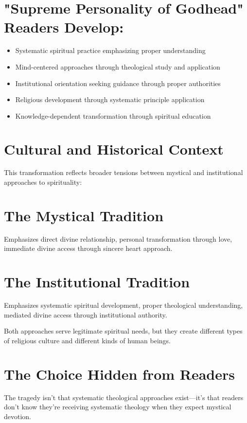 \documentclass[11pt,twoside]{book}
\begin{document}
\section*{"Supreme Personality of Godhead" Readers Develop:}
\label{sec:org614ab27}
\begin{itemize}
\item Systematic spiritual practice emphasizing proper understanding
\item Mind-centered approaches through theological study and application
\item Institutional orientation seeking guidance through proper authorities
\item Religious development through systematic principle application
\item Knowledge-dependent transformation through spiritual education
\end{itemize}
\section*{Cultural and Historical Context}
\label{sec:org702b9c1}

This transformation reflects broader tensions between mystical and institutional approaches to spirituality:
\section*{The Mystical Tradition}
\label{sec:orgc9bf535}
Emphasizes direct divine relationship, personal transformation through love, immediate divine access through sincere heart approach.
\section*{The Institutional Tradition}
\label{sec:org3746a32}
Emphasizes systematic spiritual development, proper theological understanding, mediated divine access through institutional authority.

Both approaches serve legitimate spiritual needs, but they create different types of religious culture and different kinds of human beings.
\section*{The Choice Hidden from Readers}
\label{sec:orgd8a7bbd}

The tragedy isn't that systematic theological approaches exist—it's that readers don't know they're receiving systematic theology when they expect mystical devotion.
\end{document}
